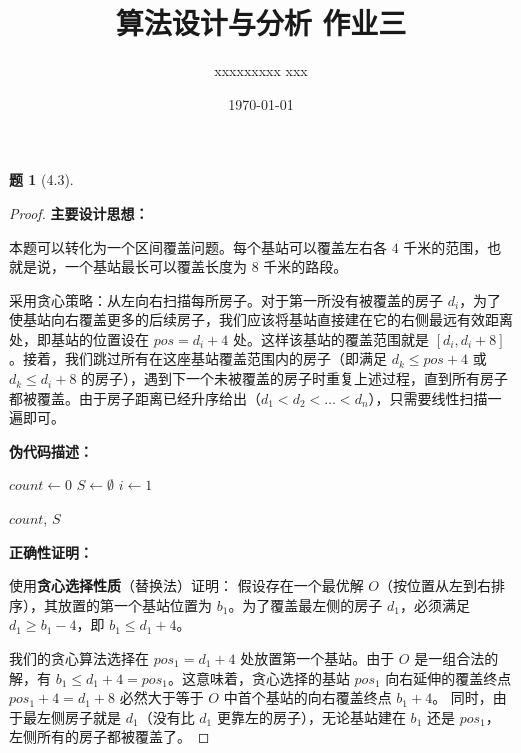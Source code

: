 \documentclass[11pt, a4paper]{article}
\title{算法设计与分析 作业三}
\author{xxxxxxxxx xxx}
\date{\today}
\newtheorem{problem}{题}
\begin{document}
\maketitle

\begin{problem}[4.3]
\end{problem}

\begin{proof}
    \textbf{主要设计思想：}
    
    本题可以转化为一个区间覆盖问题。每个基站可以覆盖左右各 $4$ 千米的范围，也就是说，一个基站最长可以覆盖长度为 $8$ 千米的路段。
    
    采用贪心策略：从左向右扫描每所房子。对于第一所没有被覆盖的房子 $d_i$，为了使基站向右覆盖更多的后续房子，我们应该将基站直接建在它的右侧最远有效距离处，即基站的位置设在 $pos = d_i + 4$ 处。这样该基站的覆盖范围就是 $[d_i, d_i + 8]$。接着，我们跳过所有在这座基站覆盖范围内的房子（即满足 $d_k \le pos + 4$ 或 $d_k \le d_i + 8$ 的房子），遇到下一个未被覆盖的房子时重复上述过程，直到所有房子都被覆盖。由于房子距离已经升序给出（$d_1 < d_2 < \dots < d_n$），只需要线性扫描一遍即可。

    \textbf{伪代码描述：}

    \begin{algorithm}[H]
    \caption{基站位置选择算法}
    
    $count \leftarrow 0$\;
    $S \leftarrow \emptyset$\;
    $i \leftarrow 1$\;
    
    \Return $count$, $S$\;
    \end{algorithm}

    \textbf{正确性证明：}
    
    使用\textbf{贪心选择性质}（替换法）证明：
    假设存在一个最优解 $O$（按位置从左到右排序），其放置的第一个基站位置为 $b_1$。为了覆盖最左侧的房子 $d_1$，必须满足 $d_1 \ge b_1 - 4$，即 $b_1 \le d_1 + 4$。
    
    我们的贪心算法选择在 $pos_1 = d_1 + 4$ 处放置第一个基站。由于 $O$ 是一组合法的解，有 $b_1 \le d_1 + 4 = pos_1$。这意味着，贪心选择的基站 $pos_1$ 向右延伸的覆盖终点 $pos_1 + 4 = d_1 + 8$ 必然大于等于 $O$ 中首个基站的向右覆盖终点 $b_1 + 4$。
    同时，由于最左侧房子就是 $d_1$（没有比 $d_1$ 更靠左的房子），无论基站建在 $b_1$ 还是 $pos_1$，左侧所有的房子都被覆盖了。
    

\end{proof}
\end{document}
